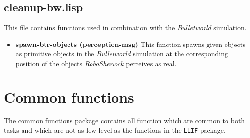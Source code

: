 \documentclass[main.tex]{subfiles}
\begin{document}
        \subsection{cleanup-bw.lisp}
        This file contains functions used in combination with the \textit{Bulletworld} simulation.
        \begin{itemize}
            \item \textbf{spawn-btr-objects (perception-msg)}
            This function spawns given objects as primitive objects in the \textit{Bulletworld} simulation at the corresponding position of the objects \textit{RoboSherlock} perceives as real.
        \end{itemize}
          
          \section{Common functions}
          \label{comf}
          
        The common functions package contains all function which are common to both tasks and which are not as low level as the functions in the \texttt{LLIF} package.
\end{document}
